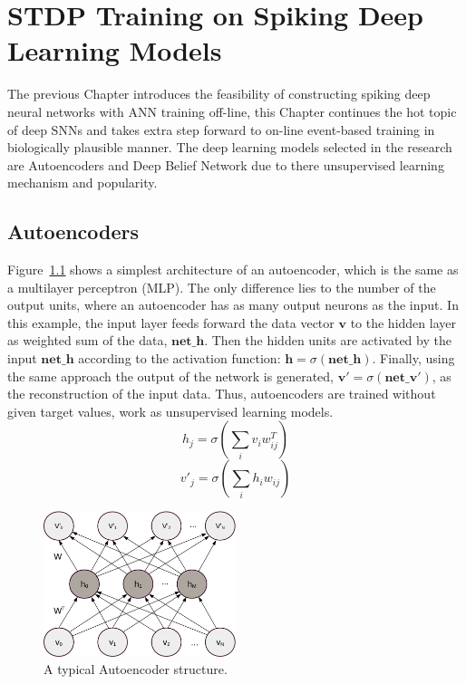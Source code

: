 \chapter{STDP Training on Spiking Deep Learning Models}
\label{cha:sdlm}

The previous Chapter introduces the feasibility of constructing spiking deep neural networks with ANN training off-line, this Chapter continues the hot topic of deep SNNs and takes extra step forward to on-line event-based training in biologically plausible manner.
The deep learning models selected in the research are Autoencoders and Deep Belief Network due to there unsupervised learning mechanism and popularity.

\section{Autoencoders}
Figure~\ref{fig:AE} shows a simplest architecture of an autoencoder, which is the same as a multilayer perceptron (MLP).
The only difference lies to the number of the output units, where an autoencoder has as many output neurons as the input.
In this example, the input layer feeds forward the data vector $\mathbf{v}$ to the hidden layer as weighted sum of the data, $\mathbf{net\_h}$.
Then the hidden units are activated by the input $\mathbf{net\_h}$ according to the activation function: $\mathbf{h}=\sigma(\mathbf{net\_h})$.
Finally, using the same approach the output of the network is generated, $\mathbf{v'}=\sigma(\mathbf{net\_v'})$, as the reconstruction of the input data.
Thus, autoencoders are trained without given target values, work as unsupervised learning models.
\begin{equation}
h_j=\sigma(\sum_i v_i w^T_{ij})
\end{equation}
\begin{equation}
v'_j=\sigma(\sum_i h_i w_{ij})
\end{equation}
	
\begin{figure}
	\centering
	\includegraphics[width=0.5\textwidth]{pics_sdlm/AE.pdf}
	\caption{A typical Autoencoder structure.}
	\label{fig:AE}
\end{figure}

